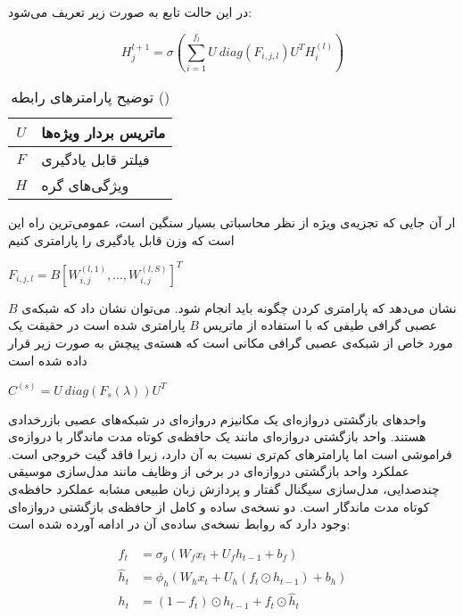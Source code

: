 
در این حالت تابع به صورت زیر تعریف می‌شود:

\begin{equation}
  \label{eq:spectral}
H_j^{l+1}=\sigma(\sum_{i=1}^{f_l}U\:diag(F_{i,j,l})U^TH_i^{(l)})
\end{equation}

\begin{table}[h]
  \centering
  \caption{توضیح پارامترهای رابطه ()}
  \begin{tabular}{|c|p{}|}
    \hline
    $U$ & ماتریس بردار ویژه‌ها \\
    \hline
    $F$ & فیلتر قابل یادگیری \\
    \hline
    $H$ & ویژگی‌های گره \\
    \hline
  \end{tabular}
  \label{tbl:distance}
\end{table}

ار آن جایی که تجزیه‌ی ویژه از نظر محاسباتی بسیار سنگین است، عمومی‌ترین راه این است که وزن قابل یادگیری را پارامتری کنیم

$F_{i,j,l}=B[W_{i,j}^{(l,1)},...,W_{i,j}^{(l,S)}]^T$

$B$ نشان می‌دهد که پارامتری کردن چگونه باید انجام شود. می‌توان نشان داد که شبکه‌ی عصبی گرافی طیفی که با استفاده از ماتریس $B$ پارامتری شده است در حقیقت یک مورد خاص از شبکه‌ی عصبی گرافی مکانی است که هسته‌ی پیچش به صورت زیر قرار داده شده است

$C^{(s)}=U\:diag(F_s(\lambda))U^T$


واحدهای بازگشتی دروازه‌ای یک مکانیزم دروازه‌ای در شبکه‌های عصبی بازرخدادی هستند.
واحد بازگشتی دروازه‌ای مانند یک حافظه‌ی کوتاه مدت ماندگار با دروازه‌ی فراموشی است اما پارامترهای کم‌تری نسبت به آن دارد، زیرا فاقد گیت خروجی است.
عملکرد واحد بازگشتی دروازه‌ای در برخی از وظایف مانند مدل‌سازی موسیقی چندصدایی، مدل‌سازی سیگنال گفتار و پردازش زبان طبیعی مشابه عملکرد حافظه‌ی کوتاه مدت ماندگار است.
دو نسخه‌ی ساده و کامل از حافظه‌ی بازگشتی دروازه‌ای وجود دارد که روابط نسخه‌ی ساده‌ی آن در ادامه آورده شده است:

\begin{equation}
  \label{eq:gru}
  \begin{aligned}
  f_{t}& = \sigma _{g} ( W_{f} x_{t} + U_{f} h_{t-1} + b_{f} )\\
  {\hat {h}}_{t}& = \phi _{h}(W_{h}x_{t}+U_{h}(f_{t}\odot h_{t-1})+b_{h})\\
  h_{t}& = (1-f_{t})\odot h_{t-1}+f_{t}\odot {\hat {h}}_{t}
  \end{aligned}
\end{equation}

